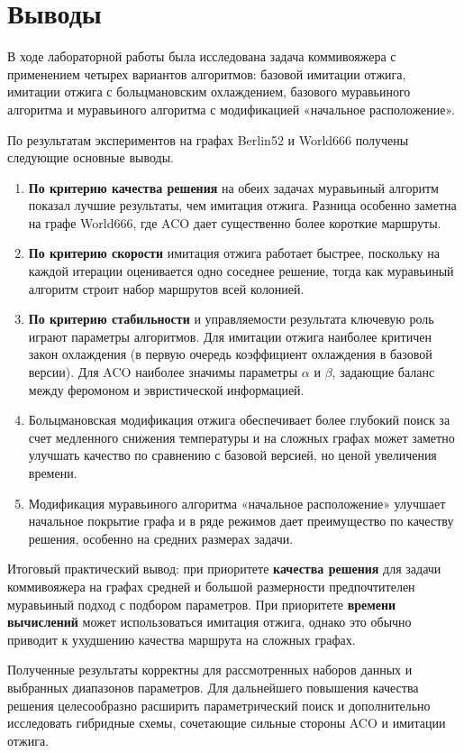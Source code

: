 \documentclass[12pt,a4paper]{article}
\begin{document}
\section{Выводы}

В ходе лабораторной работы была исследована задача коммивояжера с применением
четырех вариантов алгоритмов: базовой имитации отжига, имитации отжига с
больцмановским охлаждением, базового муравьиного алгоритма и муравьиного
алгоритма с модификацией «начальное расположение».

По результатам экспериментов на графах Berlin52 и World666 получены следующие
основные выводы.

\begin{enumerate}
    \item \textbf{По критерию качества решения} на обеих задачах муравьиный алгоритм
    показал лучшие результаты, чем имитация отжига. Разница особенно заметна на
    графе World666, где ACO дает существенно более короткие маршруты.

    \item \textbf{По критерию скорости} имитация отжига работает быстрее,
    поскольку на каждой итерации оценивается одно соседнее решение, тогда как
    муравьиный алгоритм строит набор маршрутов всей колонией.

    \item \textbf{По критерию стабильности} и управляемости результата ключевую роль
    играют параметры алгоритмов. Для имитации отжига наиболее критичен закон
    охлаждения (в первую очередь коэффициент охлаждения в базовой версии). Для ACO
    наиболее значимы параметры $\alpha$ и $\beta$, задающие баланс между феромоном и
    эвристической информацией.

    \item Больцмановская модификация отжига обеспечивает более глубокий поиск
    за счет медленного снижения температуры и на сложных графах может заметно
    улучшать качество по сравнению с базовой версией, но ценой увеличения времени.

    \item Модификация муравьиного алгоритма «начальное расположение» улучшает
    начальное покрытие графа и в ряде режимов дает преимущество по качеству
    решения, особенно на средних размерах задачи.
\end{enumerate}

Итоговый практический вывод: при приоритете \textbf{качества решения} для задачи
коммивояжера на графах средней и большой размерности предпочтителен муравьиный
подход с подбором параметров. При приоритете \textbf{времени вычислений} может
использоваться имитация отжига, однако это обычно приводит к ухудшению качества
маршрута на сложных графах.

Полученные результаты корректны для рассмотренных наборов данных и выбранных
диапазонов параметров. Для дальнейшего повышения качества решения целесообразно
расширить параметрический поиск и дополнительно исследовать гибридные схемы,
сочетающие сильные стороны ACO и имитации отжига.
\end{document}
